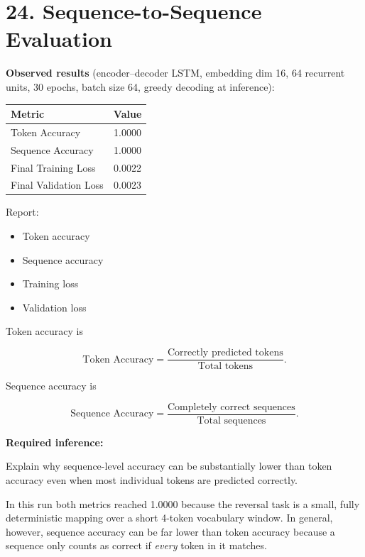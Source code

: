 \documentclass[10pt]{article}
\begin{document}
\section*{24. Sequence-to-Sequence Evaluation}

\textbf{Observed results} (encoder--decoder LSTM, embedding dim 16, 64
recurrent units, 30 epochs, batch size 64, greedy decoding at inference):

\begin{center}
\begin{tabular}{|l|c|}
\hline
Metric & Value\\
\hline
Token Accuracy & 1.0000\\
Sequence Accuracy & 1.0000\\
Final Training Loss & 0.0022\\
Final Validation Loss & 0.0023\\
\hline
\end{tabular}
\end{center}

Report:

\begin{itemize}
\item Token accuracy
\item Sequence accuracy
\item Training loss
\item Validation loss
\end{itemize}

Token accuracy is

\[
\text{Token Accuracy}
=
\frac{\text{Correctly predicted tokens}}
{\text{Total tokens}}.
\]

Sequence accuracy is

\[
\text{Sequence Accuracy}
=
\frac{\text{Completely correct sequences}}
{\text{Total sequences}}.
\]

\textbf{Required inference:}

Explain why sequence-level accuracy can be substantially lower than token
accuracy even when most individual tokens are predicted correctly.

In this run both metrics reached 1.0000 because the reversal task is a
small, fully deterministic mapping over a short 4-token vocabulary window. In general, however, sequence accuracy can be far lower than token accuracy because a
sequence only counts as correct if \emph{every} token in it matches. 

\end{document}

